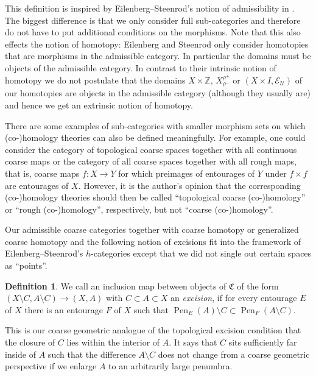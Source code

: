 \documentclass[pdftex]{sigma}
\numberwithin{equation}{section}
\theoremstyle{definition}
\newtheorem{defn}[thm]{Definition}
\newcommand{\Z}{\mathbb{Z}}
\newcommand{\cU}{\mathcal{U}}
\newcommand{\coarseStr}{\mathcal{E}}
\DeclareMathOperator{\Pen}{Pen}
\newcommand{\admissible}{{\mathfrak{C}}}
\begin{document}
This definition is inspired by Eilenberg--Steenrod's notion of admissibility in \cite[p.~5]{EilenbergSteenrod}.
The biggest difference is that we only consider full sub-categories and therefore do not have to put additional conditions on the morphisms.
Note that this also effects the notion of homotopy: Eilenberg and Steenrod only consider homotopies that are morphisms in the admissible category. In particular the domains must be objects of the admissible category. In contrast to their intrinsic notion of homotopy we do not postulate that the domains $X\times \Z$, $X_{\rho^-}^{\rho^+}$ or $(X\times I,\coarseStr_\cU)$ of our homotopies are objects in the admissible category (although they usually are) and hence we get an extrinsic notion of homotopy.

There are some examples of sub-categories with smaller morphism sets on which \mbox{(co-)}ho\-mo\-logy theories can also be defined meaningfully. For example, one could consider the category of topological coarse spaces together with all continuous coarse maps or the category of all coarse spaces together with all rough maps, that is, coarse maps $f\colon X\to Y$ for which preimages of entourages of $Y$ under $f\times f$ are entourages of $X$.
However, it is the author's opinion that the corresponding \mbox{(co-)}homology theories should then be called ``topological coarse \mbox{(co-)}homology'' or ``rough \mbox{(co-)}homology'', respectively, but not ``coarse \mbox{(co-)}homology''.

Our admissible coarse categories together with coarse homotopy or generalized coarse homotopy and the following notion of excisions fit into the framework of Eilenberg--Steenrod's $h$-categories \cite[Definition~9.1 in Section~IV.9]{EilenbergSteenrod} except that we did not single out certain spaces as ``points''.
\begin{defn}\label{defn:excisionmorphisms}
We call an inclusion map between objects of $\admissible$ of the form $(X\setminus C,A\setminus C)\to (X,A)$ with $C\subset A\subset X$ an \emph{excision}, if for every entourage $E$ of $X$ there is an entourage $F$ of $X$ such that
$\Pen_E(A)\setminus C\subset\Pen_F(A\setminus C)$.
\end{defn}
This is our coarse geometric analogue of the topological excision condition that the closure of $C$ lies within the interior of $A$. It says that $C$ sits sufficiently far inside of $A$ such that the difference $A\setminus C$ does not change from a coarse geometric perspective if we enlarge $A$ to an arbitrarily large penumbra.
\end{document}
